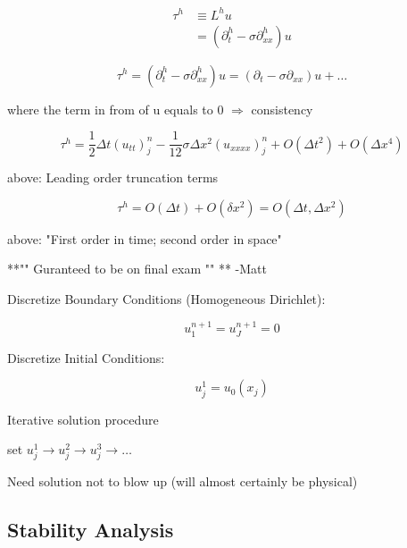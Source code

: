 \begin{align*}
    \tau ^h &\equiv L^h u \\
    &= (\partial_t^h - \sigma \partial^h_{xx}) u
\end{align*} 

\[ \tau ^h = (\partial_t^h - \sigma \partial^h_{xx}) u = (\partial_t - \sigma \partial_{xx}) u + \ldots \]

where the term in from of u equals to 0 $\Rightarrow$ consistency

\[ \tau^h = \frac{1}{2} \Delta t(u_{tt})^n_j - \frac{1}{12} \sigma \Delta x^2 (u_{xxxx})^n_j + O(\Delta t^2) + O(\Delta x^4)\]

above: Leading order truncation terms

\[ \tau^h= O(\Delta t) + O (\delta x^2) = O(\Delta t, \Delta x^2) \]

above: "First order in time; second order in space"

**"" Guranteed to be on final exam "" ** -Matt \newline

Discretize Boundary Conditions (Homogeneous Dirichlet):

\[ u_1^{n+1} = u_J^{n+1} = 0\]

Discretize Initial Conditions:

\[ u_j^1 = u_0(x_j)\]

Iterative solution procedure

set $u_j^1 \rightarrow u_j^2 \rightarrow u_j^3 \rightarrow \ldots$

Need solution not to blow up (will almost certainly be physical)

\subsection{Stability Analysis}

